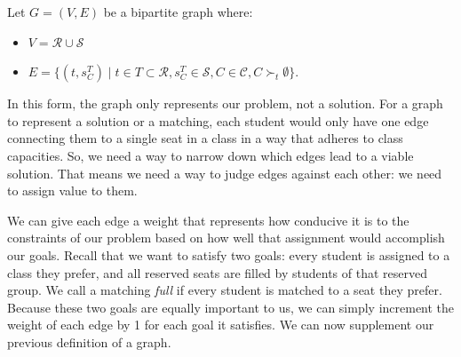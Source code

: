 \begin{definition}
  Let $G = (V, E)$ be a bipartite graph where:
  \begin{itemize}
    \item
      $V = \mathcal{R} \cup \mathcal{S}$
    \item
      $E = \{(t, s_C^T) \mid t \in T \subset \mathcal{R}, s_C^T \in \mathcal{S}, C \in
        \mathcal{C}, C \succ_t
            \emptyset\}$.
  \end{itemize}
\end{definition}

In this form, the graph only represents our problem, not a solution. For a graph
to represent a solution or a matching, each student would only have one edge
connecting them to a single seat in a class in a way that adheres to class capacities. So,
we need a way to narrow down which edges lead to a viable solution. That means
we need a way to judge edges against each other: we need to assign value to
them. 

We can give each edge a weight that represents how
conducive it is to the constraints of our problem based on how well that
assignment would accomplish our goals. Recall that we want to satisfy two goals: every
student is assigned to a class they prefer, and all reserved seats are filled by
students of that reserved group. We
call a matching \textit{full} if every student is matched to a seat they prefer. 
Because these two goals are equally important to us, we can simply increment
the weight of each edge by 1 for each goal it satisfies. We can now supplement
our previous definition of a graph.



